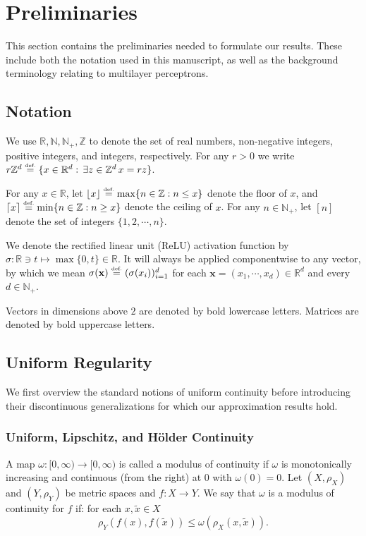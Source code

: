 \documentclass{article}
\numberwithin{equation}{section}
\theoremstyle{definition}
\newcommand{\eqdef}{\ensuremath{\stackrel{\mbox{\upshape\tiny def.}}{=}}}
\begin{document}
\section{Preliminaries}
\label{s:Prelim}
This section contains the preliminaries needed to formulate our results.  These include both the notation used in this manuscript, as well as the background terminology relating to multilayer perceptrons.

\subsection{Notation}
\label{s:Prelim__ss:Notation}
We use $\mathbb{R},\mathbb{N},\mathbb{N}_+,\mathbb{Z}$ to denote the set of real numbers, non-negative integers, positive integers, and integers, respectively.  For any $r>0$ we write $r\mathbb{Z}^d\eqdef \{x\in \mathbb{R}^d:\, \exists z\in \mathbb{Z}^d\, x=rz\}$.

For any $x\in\mathbb{R}$, let $\lfloor x \rfloor \eqdef \max\{n\in\mathbb{Z} : n \le x \}$ denote the floor of $x$, and $\lceil x \rceil \eqdef \min\{n\in\mathbb{Z} : n \ge x \}$ denote the ceiling of $x$. For any $n\in\mathbb{N}_+$, let $[n]$ denote the set of integers $\{1,2,\cdots,n\}$.

We denote the rectified linear unit (ReLU) activation function by $\sigma:\mathbb{R}\ni t \mapsto \max\{0,t\}\in \mathbb{R}$.  It will always be applied componentwise to any vector, by which we mean $\sigma(\mathbf{x})\eqdef (\sigma(x_i))_{i=1}^d$ for each $\mathbf{x}=(x_1,\cdots,x_d)\in\mathbb{R}^d$ and every $d\in \mathbb{N}_+$.  

Vectors in dimensions above $2$ are denoted by bold lowercase letters. Matrices are denoted by bold uppercase letters. 


\subsection{Uniform Regularity}
\label{s:Prelim__ss:Regularity}
We first overview the standard notions of uniform continuity before introducing their discontinuous generalizations for which our approximation results hold.
\subsubsection{Uniform, Lipschitz, and H\"{o}lder Continuity}
\label{s:Prelim__ss:Regularity___sss:UniformContinuity}
A map $\omega:[0,\infty)\to [0,\infty)$ is called a modulus of continuity if $\omega$ is monotonically increasing and continuous (from the right) at $0$ with $\omega(0)=0$.  
Let $(X,\rho_X)$ and $(Y,\rho_Y)$ be metric spaces and $f:X\to Y$.  We say that $\omega$ is a modulus of continuity for $f$ if: for each $x,\tilde{x}\in X$
\[
    \rho_Y(f(x),f(\tilde{x}))\le \omega(\rho_X(x,\tilde{x}))
.
\]
\end{document}
